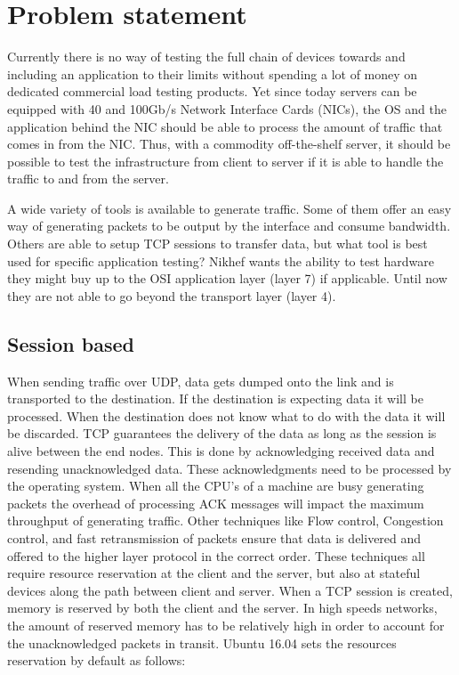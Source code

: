\chapter{Problem statement}\label{ch:problem}
Currently there is no way of testing the full chain of devices towards and including an application to their limits without spending a lot of money on dedicated commercial load testing products.
Yet since today servers can be equipped with 40 and 100Gb/s Network Interface Cards (NICs), the OS and the application behind the NIC should be able to process the amount of traffic that comes in from the NIC.
Thus, with a commodity off-the-shelf server, it should be possible to test the infrastructure from client to server if it is able to handle the traffic to and from the server.
  
A wide variety of tools is available to generate traffic. Some of them offer an easy way of generating packets to be output by the interface and consume bandwidth. 
Others are able to setup TCP sessions to transfer data, but what tool is best used for specific application testing?   
Nikhef wants the ability to test hardware they might buy up to the OSI application layer (layer 7) if applicable. 
Until now they are not able to go beyond the transport layer (layer 4). 

\section{Session based}\label{sec:sessionbased}
When sending traffic over UDP, data gets dumped onto the link and is transported to the destination. If the destination is expecting data it will be processed.
When the destination does not know what to do with the data it will be discarded. 
TCP guarantees the delivery of the data as long as the session is alive between the end nodes. 
This is done by acknowledging received data and resending unacknowledged data. These acknowledgments need to be processed by the operating system. 
When all the CPU's of a machine are busy generating packets the overhead of processing ACK messages will impact the maximum throughput of generating traffic. 
Other techniques like Flow control, Congestion control, and fast retransmission of packets ensure that data is delivered and offered to the higher layer protocol in the correct order. 
These techniques all require resource reservation at the client and the server, but also at stateful devices along the path between client and server. 
When a TCP session is created, memory is reserved by both the client and the server. In high speeds networks, the amount of reserved memory has to be relatively high in order to account for the unacknowledged packets in transit. 
Ubuntu 16.04 sets the resources reservation by default as follows:

